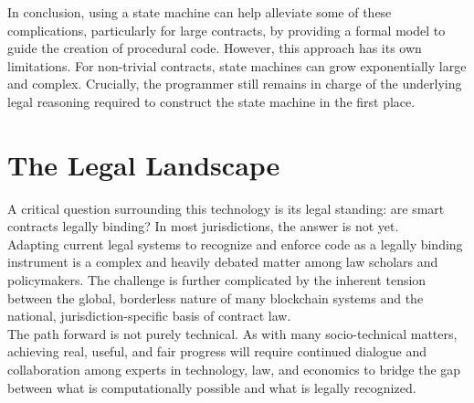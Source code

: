 \documentclass{scrbook}
\begin{document}
 In conclusion, using a state machine can help alleviate some of these complications, particularly for large contracts, by providing a formal model to guide the creation of procedural code. However, this approach has its own limitations. For non-trivial contracts, state machines can grow exponentially large and complex. Crucially, the programmer still remains in charge of the underlying legal reasoning required to construct the state machine in the first place.

\chapter{The Legal Landscape}

A critical question surrounding this technology is its legal standing: are smart contracts legally binding? In most jurisdictions, the answer is not yet.\\

Adapting current legal systems to recognize and enforce code as a legally binding instrument is a complex and heavily debated matter among law scholars and policymakers. The challenge is further complicated by the inherent tension between the global, borderless nature of many blockchain systems and the national, jurisdiction-specific basis of contract law.\\

The path forward is not purely technical. As with many socio-technical matters, achieving real, useful, and fair progress will require continued dialogue and collaboration among experts in technology, law, and economics to bridge the gap between what is computationally possible and what is legally recognized.
\end{document}

